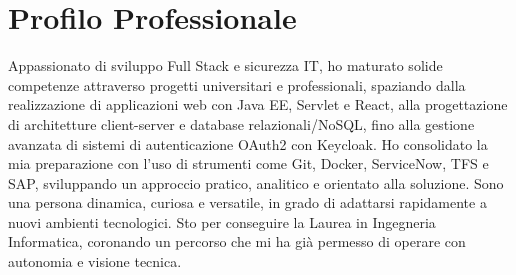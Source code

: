 \documentclass[a4paper,10pt]{article}
\begin{document}
\section*{\faUser \quad Profilo Professionale}
Appassionato di sviluppo Full Stack e sicurezza IT, ho maturato solide competenze attraverso progetti universitari e professionali, spaziando dalla realizzazione di applicazioni web con Java EE, Servlet e React, alla progettazione di architetture client-server e database relazionali/NoSQL, fino alla gestione avanzata di sistemi di autenticazione OAuth2 con Keycloak. Ho consolidato la mia preparazione con l’uso di strumenti come Git, Docker, ServiceNow, TFS e SAP, sviluppando un approccio pratico, analitico e orientato alla soluzione. Sono una persona dinamica, curiosa e versatile, in grado di adattarsi rapidamente a nuovi ambienti tecnologici. Sto per conseguire la Laurea in Ingegneria Informatica, coronando un percorso che mi ha già permesso di operare con autonomia e visione tecnica.

\vspace{0mm} %

\hrulefill

\end{document}

